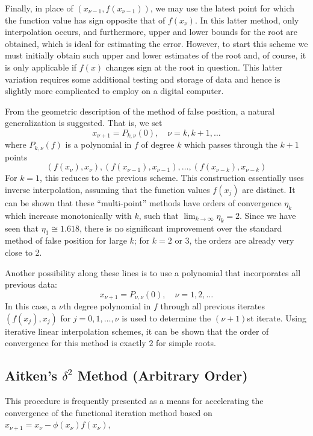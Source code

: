 \documentclass[../main.tex]{subfiles}
\begin{document}
Finally, in place of $(x_{\nu - 1}, f(x_{\nu - 1}))$, we may use the latest point for which the function value has sign opposite that of $f(x_{\nu})$. In this latter method, only interpolation occurs, and furthermore, upper and lower bounds for the root are obtained, which is ideal for estimating the error. However, to start this scheme we must initially obtain such upper and lower estimates of the root and, of course, it is only applicable if $f(x)$ changes sign at the root in question. This latter variation requires some additional testing and storage of data and hence is slightly more complicated to employ on a digital computer.

From the geometric description of the method of false position, a natural generalization is suggested. That is, we set
\begin{equation}
	x_{\nu+1} = P_{k, \nu}(0), \quad \nu = k, k + 1, \ldots
\end{equation}
where $P_{k, \nu}(f)$ is a polynomial in $f$ of degree $k$ which passes through the $k + 1$ points
\begin{equation*}
	(f(x_\nu), x_\nu), (f(x_{\nu-1}), x_{\nu-1}), \dots, (f(x_{\nu-k}), x_{\nu-k})
\end{equation*}
For $k=1$, this reduces to the previous scheme. This construction essentially uses inverse interpolation, assuming that the function values $f(x_j)$ are distinct. It can be shown that these ``multi-point'' methods have orders of convergence $\eta_k$ which increase monotonically with $k$, such that $\lim_{k \to \infty} \eta_k = 2$. Since we have seen that $\eta_1 \cong 1.618$, there is no significant improvement over the standard method of false position for large $k$; for $k = 2$ or $3$, the orders are already very close to 2.

Another possibility along these lines is to use a polynomial that incorporates all previous data:
\begin{equation}
	x_{\nu+1} = P_{\nu, \nu}(0), \quad \nu = 1, 2, \dots
\end{equation}
In this case, a $\nu$th degree polynomial in $f$ through all previous iterates $(f(x_j), x_j)$ for $j = 0, 1, \dots, \nu$ is used to determine the $(\nu + 1)$st iterate. Using iterative linear interpolation schemes, it can be shown that the order of convergence for this method is exactly $2$ for simple roots.

\subsection{Aitken's $\delta^2$ Method (Arbitrary Order)}
This procedure is frequently presented as a means for accelerating the convergence of the functional iteration method based on $x_{\nu+1} = x_\nu - \phi(x_\nu) f(x_\nu)$,
\end{document}
